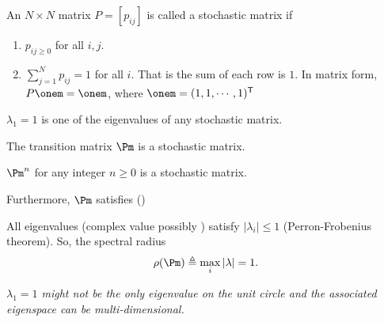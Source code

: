 \documentclass[english,10pt]{beamer}
\begin{document}


\begin{frame}
\begin{definition}
An $N\times N$ matrix $P=[p_{ij}]$ is called a stochastic matrix if 
\begin{enumerate}[<+->]
\item $p_{ij\geq0}$ for all $i,j$.
\item $\sum_{j=1}^{N}p_{ij}=1$ for all $i$.  That is  the sum of each row is
$1$. In matrix form, $P\onem=\onem$, where $\onem=(1,1,\cdots,1)^\tr$
\end{enumerate}
\end{definition}
\pause
$\lambda_1=1$ is one of the eigenvalues of any stochastic matrix.
\pause
\begin{theorem}
\bizp
\item
The transition matrix $\Pm$ is a stochastic matrix.
\item 
  $\Pm^n$ for any integer  $n\geq 0$ is a stochastic matrix.
  \eiz
\end{theorem}
\pause
Furthermore, $\Pm$  satisfies (\optional)
\biz[<+->]
\item All eigenvalues (complex value possibly ) satisfy $|\lambda_i|\leq 1$ (Perron-Frobenius theorem). So, the spectral radius  
\[ \rho(\Pm)\triangleq \max_i |\lambda| =1.\]
\item {\it $\lambda_1=1$ might not be the only eigenvalue on the unit circle and the associated eigenspace can be multi-dimensional.}
\eiz

\end{frame}
\end{document}
